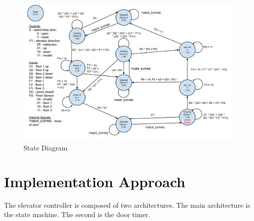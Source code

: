 \documentclass[journal]{IEEEtran}
\begin{document}
%




\begin{figure}[t]
\centering
\includegraphics[width=0.9\linewidth]{ElevatorStateMachine}
\caption{State Diagram}
\label{fig_state_machine}
\end{figure}

\section{Implementation Approach}
The elevator controller is composed of two architectures. The main architecture is the state machine. 
The second is the door timer.
\end{document}
